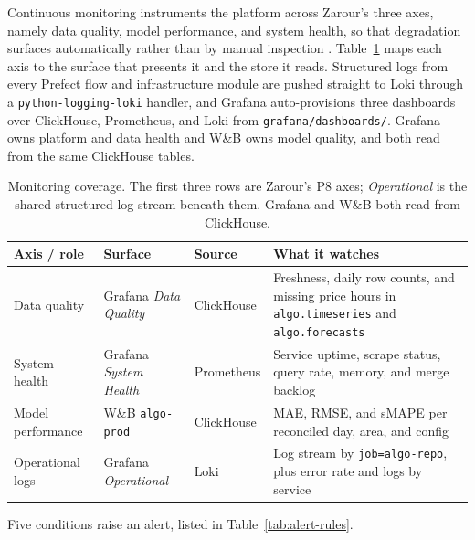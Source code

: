 Continuous monitoring instruments the platform across Zarour's three axes,
namely data quality, model performance, and system health, so that degradation
surfaces automatically rather than by manual inspection \cite{zarour2025}.
Table~\ref{tab:monitoring-coverage} maps each axis to the surface that presents
it and the store it reads. Structured logs from every Prefect flow and
infrastructure module are pushed straight to Loki through a
\texttt{python-logging-loki} handler, and Grafana
auto-provisions three dashboards over ClickHouse, Prometheus, and Loki from
\texttt{grafana/dashboards/}. Grafana owns platform and data health and W\&B
owns model quality, and both read from the same ClickHouse tables.

\begin{table}[H]
  \centering
  \small
  \renewcommand{\arraystretch}{1.3}
  \setlength{\tabcolsep}{6pt}
  \caption{Monitoring coverage. The first three rows are Zarour's P8 axes; \emph{Operational} is the shared structured-log stream beneath them. Grafana and W\&B both read from ClickHouse.}
  \label{tab:monitoring-coverage}
  \begin{tabularx}{\linewidth}{@{}l l l >{\raggedright\arraybackslash}X@{}}
    \toprule
    \textbf{Axis / role} & \textbf{Surface} & \textbf{Source} & \textbf{What it watches} \\
    \midrule
    Data quality      & Grafana \emph{Data Quality}  & ClickHouse & Freshness, daily row counts, and missing price hours in \texttt{algo.timeseries} and \texttt{algo.forecasts} \\
    System health     & Grafana \emph{System Health} & Prometheus & Service uptime, scrape status, query rate, memory, and merge backlog \\
    Model performance & W\&B \texttt{algo-prod}       & ClickHouse & MAE, RMSE, and sMAPE per reconciled day, area, and config \\
    Operational logs  & Grafana \emph{Operational}   & Loki       & Log stream by \texttt{job=algo-repo}, plus error rate and logs by service \\
    \bottomrule
  \end{tabularx}
\end{table}

Five conditions raise an alert, listed in Table~\ref{tab:alert-rules}.

